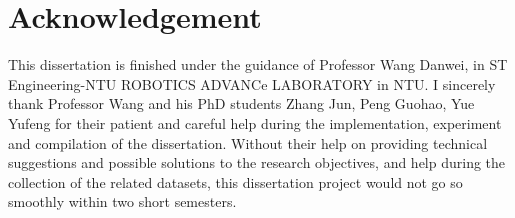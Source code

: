 
\chapter*{Acknowledgement}


This dissertation is finished under the guidance of Professor Wang Danwei, in ST Engineering-NTU ROBOTICS ADVANCe LABORATORY in NTU.
I sincerely thank Professor Wang and his PhD students Zhang Jun, Peng Guohao, Yue Yufeng for their patient and careful help during the implementation, experiment and compilation of the dissertation. 
Without their help on providing technical suggestions and possible solutions to the research objectives, and help during the collection of the related datasets, this dissertation project would not go so smoothly within two short semesters.


